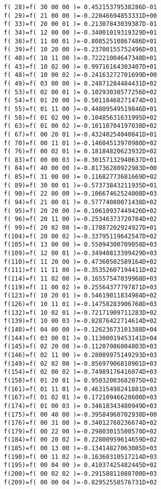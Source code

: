 {\begin{verbatim}
  f( 28)=f( 30 00 00 )= 0.45215379538286D-01
  f( 29)=f( 21 00 00 )=-0.22046694853331D+00
  f( 33)=f( 20 00 01 )= 0.21307843039387D-01
  f( 34)=f( 12 00 00 )=-0.34001019319329D+01
  f( 38)=f( 11 00 01 )=-0.80852510867486D+01
  f( 39)=f( 10 20 00 )=-0.23700155752496D+01
  f( 40)=f( 10 11 00 )=-0.72221004647340D+01
  f( 43)=f( 10 02 00 )= 0.99716164303407D+01
  f( 48)=f( 10 00 02 )=-0.24163272701699D+00
  f( 49)=f( 03 00 00 )= 0.24871284484431D+02
  f( 53)=f( 02 00 01 )= 0.10293038577256D+02
  f( 54)=f( 01 20 00 )= 0.50118468271474D+01
  f( 55)=f( 01 11 00 )=-0.44809549519846D+01
  f( 58)=f( 01 02 00 )= 0.10485631631995D+02
  f( 63)=f( 01 00 02 )=-0.10110704197038D+02
  f( 67)=f( 00 20 01 )=-0.43240254040841D+01
  f( 70)=f( 00 11 01 )=-0.14604513970980D+02
  f( 76)=f( 00 02 01 )= 0.18184820623932D+02
  f( 83)=f( 00 00 03 )=-0.30157132940637D+01
  f( 84)=f( 40 00 00 )=-0.81736280922983D+00
  f( 85)=f( 31 00 00 )= 0.11682773681669D+02
  f( 89)=f( 30 00 01 )=-0.57373843211935D+01
  f( 90)=f( 22 00 00 )=-0.10667462524008D+03
  f( 94)=f( 21 00 01 )= 0.57774080071438D+02
  f( 95)=f( 20 20 00 )= 0.10610937449426D+02
  f( 96)=f( 20 11 00 )=-0.25346373720784D+02
  f( 99)=f( 20 02 00 )=-0.17887202924927D+01
  f(104)=f( 20 00 02 )=-0.33795119642547D+02
  f(105)=f( 13 00 00 )= 0.55094300709058D+03
  f(109)=f( 12 00 01 )=-0.34940813399429D+03
  f(110)=f( 11 20 00 )= 0.47360502589164D+02
  f(111)=f( 11 11 00 )=-0.35352607194411D+02
  f(114)=f( 11 02 00 )= 0.16557547039968D+03
  f(119)=f( 11 00 02 )= 0.25564377797871D+03
  f(123)=f( 10 20 01 )= 0.54619011834984D+02
  f(126)=f( 10 11 01 )=-0.14758283906768D+03
  f(132)=f( 10 02 01 )=-0.72171909711283D+02
  f(139)=f( 10 00 03 )=-0.82876422714614D+02
  f(140)=f( 04 00 00 )=-0.12623673101388D+04
  f(144)=f( 03 00 01 )= 0.11300019453141D+04
  f(145)=f( 02 20 00 )=-0.11207086004803D+03
  f(146)=f( 02 11 00 )= 0.28089975149293D+03
  f(149)=f( 02 02 00 )=-0.85697906810901D+03
  f(154)=f( 02 00 02 )=-0.74989176416074D+03
  f(158)=f( 01 20 01 )= 0.95032003682075D+02
  f(161)=f( 01 11 01 )= 0.46315498241881D+03
  f(167)=f( 01 02 01 )= 0.17210946628600D+03
  f(174)=f( 01 00 03 )= 0.34618343480949D+03
  f(175)=f( 00 40 00 )=-0.39584960702938D+00
  f(176)=f( 00 31 00 )= 0.34012760236674D+02
  f(179)=f( 00 22 00 )=-0.29803015500570D+02
  f(184)=f( 00 20 02 )= 0.22800959614659D+02
  f(185)=f( 00 13 00 )=-0.13414827063085D+03
  f(190)=f( 00 11 02 )=-0.16360310517214D+03
  f(195)=f( 00 04 00 )= 0.41037425482445D+02
  f(200)=f( 00 02 02 )=-0.29158811088700D+03
  f(209)=f( 00 00 04 )=-0.82952558576731D+02


\end{verbatim}}
